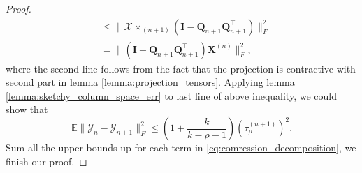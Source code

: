 \begin{lem}
\begin{proof}
\begin{equation}
\begin{aligned}
&\le \|\mathscr{X}\times_{(n+1)} (\mathbf{I} - \mathbf{Q}_{n+1}\mathbf{Q}_{n+1}^\top)\|_F^2 \\
&= \| (\mathbf{I} - \mathbf{Q}_{n+1}\mathbf{Q}_{n+1}^\top)\mathbf{X}^{(n)}\|_F^2,
\end{aligned}
\end{equation}
where the second line follows from the fact that the projection is contractive with second part in lemma \ref{lemma:projection_tensors}. 
Applying lemma \ref{lemma:sketchy_column_space_err} to last line of above inequality, we could show that 
\begin{equation}
\mathbb{E} \|\mathscr{Y}_n - \mathscr{Y}_{n+1}\|_F^2 \le \left(1+\frac{k}{k-\rho-1}\right)(\tau^{(n+1)}_\rho)^2.
\end{equation}
Sum all the upper bounds up for each term in  \eqref{eq:comression_decomposition}, we finish our proof. 
\end{proof}
\end{lem}